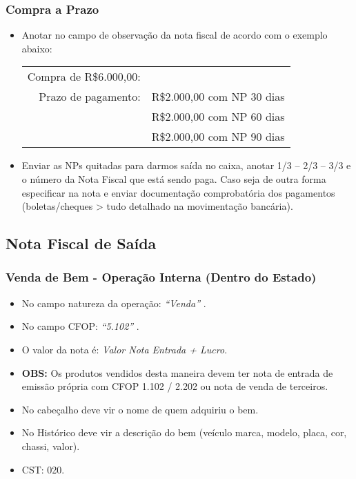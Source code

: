 \documentclass{article}
\newcommand{\itasp}[1]{
  \textit{``#1''}
}
\begin{document}
\subsubsection{Compra a Prazo}
\label{emissaonfe:entrada-prazo}
\begin{itemize}
  \item Anotar no campo de observação da nota fiscal de acordo com o exemplo abaixo:
  \begin{tcolorbox}[title=Exemplo]
    \begin{tabular}{rr}
      Compra de R\$6.000,00: & \\
      Prazo de pagamento: & R\$2.000,00 com NP 30 dias \\
      & R\$2.000,00 com NP 60 dias \\
      & R\$2.000,00 com NP 90 dias \\
    \end{tabular}
  \end{tcolorbox}
  \item Enviar as NPs quitadas para darmos saída no caixa, anotar 1/3 – 2/3 – 3/3 e o número da Nota Fiscal que está sendo paga. Caso seja de outra forma especificar na nota e enviar documentação comprobatória dos pagamentos (boletas/cheques > tudo detalhado na movimentação bancária).
  
\end{itemize}

\subsection{Nota Fiscal de Saída}
\label{emissaonfe:saida}
\subsubsection{Venda de Bem - Operação Interna (Dentro do Estado)}
\label{emissaonfe:saida-venda-interna}
  \begin{itemize}
    \item No campo natureza da operação: \itasp{Venda}.
    \item No campo CFOP: \itasp{5.102}.
    \item O valor da nota é: \textit{Valor Nota Entrada + Lucro}.
    \item \textbf{OBS:} Os produtos vendidos desta maneira devem ter nota de entrada de emissão própria com CFOP 1.102 / 2.202 ou nota de venda de terceiros.
    \item No cabeçalho deve vir o nome de quem adquiriu o bem.
    \item No Histórico deve vir a descrição do bem (veículo marca, modelo, placa, cor, chassi, valor).
    \item CST: 020.
  \end{itemize}
\end{document}
